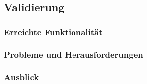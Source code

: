 \subsection{Validierung}

\subsubsection{Erreichte Funktionalität}

\subsubsection{Probleme und Herausforderungen}

\subsubsection{Ausblick}
